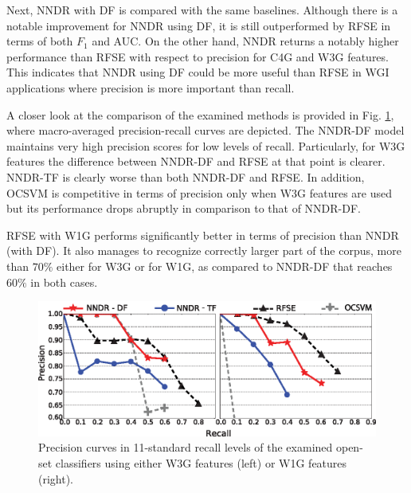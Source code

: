 Next, NNDR with DF is compared with the same baselines. Although there is a notable improvement for NNDR using DF, it is still outperformed by RFSE in terms of both $F_{1}$ and AUC. On the other hand, NNDR returns a notably higher performance than RFSE with respect to precision for C4G and W3G features. This indicates that NNDR using DF could be more useful than RFSE in WGI applications where precision is more important than recall.

A closer look at  the comparison of the examined methods is provided in Fig. \ref{chap:word_embeddings:fig:NNDR_W3G_Best_RFSE_Baseline}, where macro-averaged precision-recall curves are depicted. The NNDR-DF model maintains very high precision scores for low levels of recall. Particularly, for W3G features the difference between NNDR-DF and RFSE at that point is clearer. NNDR-TF is clearly worse than both NNDR-DF and RFSE. In addition, OCSVM is competitive in terms of precision only when W3G features are used but its performance drops abruptly in comparison to that of NNDR-DF. 

RFSE with W1G performs significantly better in terms of precision than NNDR (with DF). It also manages to recognize correctly larger part of the corpus, more than $70\%$ either for W3G or for W1G, as compared to NNDR-DF that reaches $60\%$ in both cases. 

\begin{figure}[t]
\begin{center}
    \includegraphics[scale=0.95]{Figures/NNDR_W3G-W1G_Best_RFSE-OCSVM-Baselines.eps}
	\caption{Precision curves in 11-standard recall levels of the examined open-set classifiers using either W3G features (left) or W1G features (right).}
	\label{chap:word_embeddings:fig:NNDR_W3G_Best_RFSE_Baseline}
	\end{center}
\end{figure}


